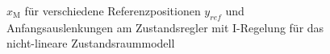 \documentclass[
	pagesize,
	fontsize=12pt,
	paper=a4,
	oneside,
   reqno
]{scrartcl}
\begin{document}
\begin{figure}[H]
    \centering
    \caption[$x_{\mathrm{M}}$ für Regler mit I-Regelung (nicht-linear)]{$x_{\mathrm{M}}$ für verschiedene Referenzpositionen $y_{ref}$ und Anfangsauslenkungen am Zustandsregler mit I-Regelung für das nicht-lineare Zustandsraummodell}
    \label{fig:Bild28}
\end{figure}
\end{document}
